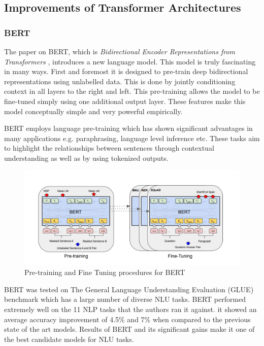 \documentclass[12pt]{report}
\begin{document}
		\subsection{Improvements of Transformer Architectures}\label{232}

		\subsubsection{BERT}\label{2321}

			The paper on BERT, which is \textit{Bidirectional Encoder Representations from Transformers} \citep{bert}, introduces a new language model. This model is truly fascinating in many ways. First and foremost it is designed to pre-train deep bidirectional representations using unlabelled data. This is done by jointly conditioning context in all layers to the right and left. This pre-training allows the model to be fine-tuned simply using one additional output layer. These features make this model conceptually simple and very powerful empirically.

			BERT employs language pre-training \citep{dai} which has shown significant advantages in many applications e.g. paraphrasing, language level inference etc. These tasks aim to highlight the relationships between sentences through contextual understanding as well as by using tokenized outputs.
			\begin{figure}[h!]
				\centering
				\includegraphics[scale=0.35]{../images/BERT.png}
				\caption{Pre-training and Fine Tuning procedures for BERT \citep{bert}}\label{bertPretraining}
			\end{figure}

			BERT was tested on The General Language Understanding Evaluation (GLUE) benchmark \citep{wang} which has a large number of diverse NLU tasks.
			BERT performed extremely well on the 11 NLP tasks that the authors ran it against. it showed an average accuracy improvement of 4.5\% and 7\% when compared to the previous state of the art models. Results of BERT and its significant gains make it one of the best candidate models for NLU tasks.
\end{document}
